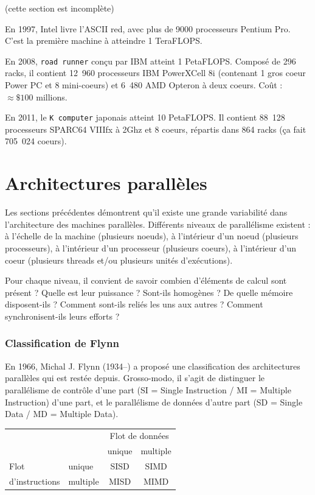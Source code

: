 
(cette section est incomplète)

En 1997, Intel livre l'ASCII red, avec plus de 9000 processeurs Pentium
Pro. C'est la première machine à atteindre 1 TeraFLOPS.

En 2008, \texttt{road runner} conçu par IBM atteint 1 PetaFLOPS. Composé de 296
racks, il contient 12~960 processeurs IBM PowerXCell 8i (contenant 1 gros coeur
Power PC et 8 mini-coeurs) et 6~480 AMD Opteron à deux coeurs. Coût :
$\approx \$100$ millions.

En 2011, le \texttt{K computer} japonais atteint 10 PetaFLOPS. Il contient
88~128 processeurs SPARC64 VIIIfx à 2Ghz et 8 coeurs, répartis dans 864 racks
(ça fait 705~024 coeurs).

\section{Architectures parallèles}

Les sections précédentes démontrent qu'il existe une grande variabilité dans
l'architecture des machines parallèles. Différents niveaux de parallélisme
existent : à l'échelle de la machine (plusieurs noeuds), à l'intérieur d'un
noeud (plusieurs processeurs), à l'intérieur d'un processeur (plusieurs coeurs),
à l'intérieur d'un coeur (plusieurs threads et/ou plusieurs unités d'exécutions).

Pour chaque niveau, il convient de savoir combien d'éléments de calcul sont
présent ?  Quelle est leur puissance ? Sont-ils homogènes ? De quelle mémoire
disposent-ils ? Comment sont-ils reliés les uns aux autres ? Comment
synchronisent-ils leurs efforts ?

\subsubsection{Classification de Flynn} En 1966, Michal J. Flynn (1934--) a proposé
une classification des architectures parallèles qui est restée
depuis. Grosso-modo, il s'agit de distinguer le parallélisme de contrôle d'une
part (SI = Single Instruction / MI = Multiple Instruction) d'une part, et le
parallélisme de données d'autre part (SD = Single Data / MD = Multiple Data).

\begin{center}
\begin{tabular}{|l|l|c|c|}
\cline{3-4}
\multicolumn{2}{c|}{}    & \multicolumn{2}{c|}{Flot de données} \\
\cline{3-4}
\multicolumn{2}{c|}{}    & unique & multiple \\
\hline
Flot           & unique   & SISD   & SIMD \\
\cline{2-4}
d'instructions & multiple & MISD   & MIMD \\
\hline
\end{tabular}
\end{center}

